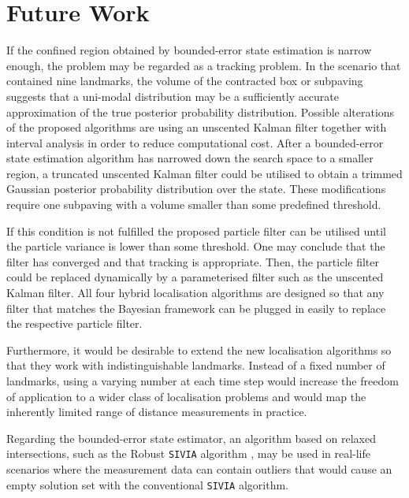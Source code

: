 \section{Future Work}\label{sec:future_work}

If the confined region obtained by bounded-error state estimation is narrow enough, the problem may be regarded as a tracking problem. In the scenario that contained nine landmarks, the volume of the contracted box or subpaving suggests that a uni-modal distribution may be a sufficiently accurate approximation of the true posterior probability distribution. Possible alterations of the proposed algorithms are using an unscented Kalman filter together with interval analysis in order to reduce computational cost. After a bounded-error state estimation algorithm has narrowed down the search space to a smaller region, a truncated unscented Kalman filter \cite{6178018} could be utilised to obtain a trimmed Gaussian posterior probability distribution over the state. These modifications require one subpaving with a volume smaller than some predefined threshold.

If this condition is not fulfilled the proposed particle filter can be utilised until the particle variance is lower than some threshold. One may conclude that the filter has converged and that tracking is appropriate. Then, the particle filter could be replaced dynamically by a parameterised filter such as the unscented Kalman filter. All four hybrid localisation algorithms are designed so that any filter that matches the Bayesian framework can be plugged in easily to replace the respective particle filter.


Furthermore, it would be desirable to extend the new localisation algorithms so that they work with indistinguishable landmarks. Instead of a fixed number of landmarks, using a varying number at each time step would increase the freedom of application to a wider class of localisation problems and would map the inherently limited range of distance measurements in practice.

Regarding the bounded-error state estimator, an algorithm based on relaxed intersections, such as the Robust \texttt{SIVIA} algorithm \cite{rsivia}, may be used in real-life scenarios where the measurement data can contain outliers that would cause an empty solution set with the conventional \texttt{SIVIA} algorithm.

